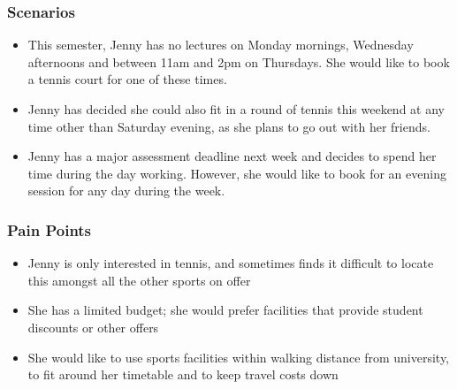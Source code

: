 \subsubsection*{Scenarios}
\label{ssub:Student-scenarios}

\begin{itemize}
	\item This semester, Jenny has no lectures on Monday mornings,
		Wednesday afternoons and between 11am and 2pm on Thursdays.
		She would like to book a tennis court for one of these times.

	\item Jenny has decided she could also fit in a round of tennis
		this weekend at any time other than Saturday evening, as she
		plans to go out with her friends.

	\item Jenny has a major assessment deadline next week and decides
		to spend her time during the day working. However, she would
		like to book for an evening session for any day during the
		week.
\end{itemize}


\subsubsection*{Pain Points}
\label{ssub:Student-pain_points}

\begin{itemize}
	\item Jenny is only interested in tennis, and sometimes finds it
		difficult to locate this amongst all the other sports on offer

	\item She has a limited budget; she would prefer facilities that
		provide student discounts or other offers

	\item She would like to use sports facilities within walking
		distance from university, to fit around her timetable and to
		keep travel costs down
\end{itemize}


